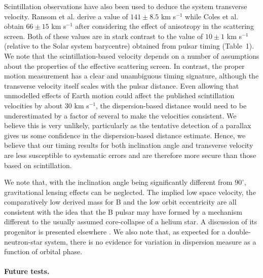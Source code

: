 \documentclass[12pt,psfig]{article}
\begin{document}
Scintillation observations have also been used to deduce
the system transverse velocity. Ransom et al.\cite{rkr+04} derive a value of
$141\pm 8.5$ km s$^{-1}$ while Coles et al.\cite{cmr+05} obtain $66 \pm 15$ km
s$^{-1}$ after considering the effect of anisotropy in the scattering screen.
Both of these values are in stark contrast to the value of $10 \pm 1$ km
s$^{-1}$ (relative to the Solar system barycentre) obtained from pulsar timing
(Table~1).  We note that the scintillation-based velocity depends on a number
of assumptions about the properties of the effective scattering screen. In
contrast, the proper motion measurement has a clear and unambiguous timing
signature, although the transverse velocity itself scales with the pulsar
distance. Even allowing that unmodelled effects of Earth motion could affect
the published scintillation velocities by about 30 km s$^{-1}$, the
dispersion-based distance would need to be underestimated by a factor of
several to make the velocities consistent.  We believe this is very unlikely,
particularly as the tentative detection of a parallax gives us some confidence
in the dispersion-based distance estimate.  Hence, we believe that
our timing results for both
inclination angle and transverse velocity are less susceptible to systematic
errors and are therefore more secure than those based on scintillation.

We note that, with the inclination angle being significantly different
from $90^\circ$, gravitational lensing effects\cite{rl06} can be
neglected. The implied low space velocity, the comparatively low
derived mass for B and the low orbit eccentricity are all consistent with
the idea that the B pulsar may have formed by a mechanism different to
the usually assumed core-collapse of a helium
star\cite{prps02,ps05}. 
A discussion of its progenitor is presented elsewhere \cite{std+06}.
We also note that, as expected for a
double-neutron-star system, there is no evidence for variation in
dispersion measure as a function of orbital phase.

\paragraph*{Future tests.}
\end{document}
